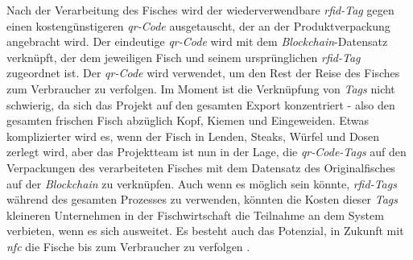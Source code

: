 Nach der Verarbeitung des Fisches wird der wiederverwendbare \textit{\ac{rfid}-Tag} gegen einen kostengünstigeren \textit{\ac{qr}-Code} ausgetauscht, der an der Produktverpackung angebracht wird. Der eindeutige \textit{\ac{qr}-Code} wird mit dem \textit{Blockchain}-Datensatz verknüpft, der dem jeweiligen Fisch und seinem ursprünglichen \textit{\ac{rfid}-Tag} zugeordnet ist. Der \textit{\ac{qr}-Code} wird verwendet, um den Rest der Reise des Fisches zum Verbraucher zu verfolgen. Im Moment ist die Verknüpfung von \textit{Tags} nicht schwierig, da sich das Projekt auf den gesamten Export konzentriert - also den gesamten frischen Fisch abzüglich Kopf, Kiemen und Eingeweiden. Etwas komplizierter wird es, wenn der Fisch in Lenden, Steaks, Würfel und Dosen zerlegt wird, aber das Projektteam ist nun in der Lage, die \textit{\ac{qr}-Code-Tags} auf den Verpackungen des verarbeiteten Fisches mit dem Datensatz des Originalfisches auf der \textit{Blockchain} zu verknüpfen. Auch wenn es möglich sein könnte, \textit{\ac{rfid}-Tags} während des gesamten Prozesses zu verwenden, könnten die Kosten dieser \textit{Tags} kleineren Unternehmen in der Fischwirtschaft die Teilnahme an dem System verbieten, wenn es sich ausweitet. Es besteht auch das Potenzial, in Zukunft mit \textit{\ac{nfc}} die Fische bis zum Verbraucher zu verfolgen \citep{Visser2017, McEntire2019}.

